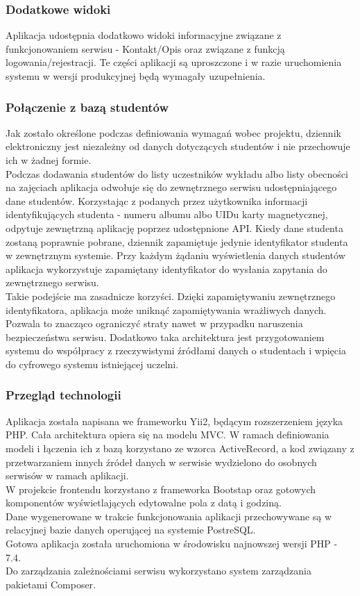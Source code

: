 \documentclass[declaration,shortabstract, mgr]{iithesis}
\begin{document}
\subsubsection{Dodatkowe widoki}
\indent Aplikacja udostępnia dodatkowo widoki informacyjne związane z funkcjonowaniem serwisu - Kontakt/Opis oraz związane z funkcją logowania/rejestracji. Te części aplikacji są uproszczone i w razie uruchomienia systemu w wersji produkcyjnej będą wymagały uzupełnienia.

\subsubsection{Połączenie z bazą studentów}
\indent Jak zostało określone podczas definiowania wymagań wobec projektu, dziennik elektroniczny jest niezależny od danych dotyczących studentów i nie przechowuje ich w żadnej formie.\\
\indent Podczas dodawania studentów do listy uczestników wykładu albo listy obecności na zajęciach aplikacja odwołuje się do zewnętrznego serwisu udostępniającego dane studentów. Korzystając z podanych przez użytkownika informacji identyfikujących studenta - numeru albumu albo UIDu karty magnetycznej, odpytuje zewnętrzną aplikację poprzez udostępnione API. Kiedy dane studenta zostaną poprawnie pobrane, dziennik zapamiętuje jedynie identyfikator studenta w zewnętrznym systemie. Przy każdym żądaniu wyświetlenia danych studentów aplikacja wykorzystuje zapamiętany identyfikator do wysłania zapytania do zewnętrznego serwisu. \\
\indent Takie podejście ma zasadnicze korzyści. Dzięki zapamiętywaniu zewnętrznego identyfikatora, aplikacja może uniknąć zapamiętywania wrażliwych danych. Pozwala to znacząco ograniczyć straty nawet w przypadku naruszenia bezpieczeństwa serwisu. Dodatkowo taka architektura jest przygotowaniem systemu do współpracy z rzeczywistymi źródłami danych o studentach i wpięcia do cyfrowego systemu istniejącej uczelni.\\
\subsubsection{Przegląd technologii}
\indent Aplikacja została napisana we frameworku Yii2\cite{yii}, będącym rozszerzeniem języka PHP. Cała architektura opiera się na modelu MVC. W ramach definiowania modeli i łączenia ich z bazą korzystano ze wzorca ActiveRecord, a kod związany z przetwarzaniem innych źródeł danych w serwisie wydzielono do osobnych serwisów w ramach aplikacji.\\
\indent W projekcie frontendu korzystano z frameworka Bootstap\cite{bootstrap} oraz gotowych komponentów\cite{kartik}\cite{da1}\cite{da2} wyświetlających edytowalne pola z datą i godziną. \\
\indent Dane wygenerowane w trakcie funkcjonowania aplikacji przechowywane są w relacyjnej bazie danych operującej na systemie PostreSQL\cite{psql}.\\
\indent Gotowa aplikacja została uruchomiona w środowisku najnowszej wersji PHP - 7.4.\\
\indent Do zarządzania zależnościami serwisu wykorzystano system zarządzania pakietami Composer\cite{composer}.
\end{document}

